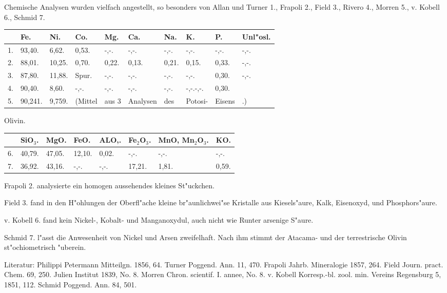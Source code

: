 \documentclass[a4paper, 11pt, oneside]{article}
\begin{document}
Chemische Analysen wurden vielfach angestellt, so besonders von Allan und Turner 1., Frapoli 2., Field 3., Rivero 4., Morren 5., v. Kobell 6., Schmid 7.
\begin{table}[H]
    \centering
    \footnotesize
    \begin{tabular}{l l l l l l l l l l}
         & Fe. & Ni. & Co. & Mg. & Ca. & Na. & K. & P. & Unl"osl. \\ \hline
        1. & 93,40. & 6,62. & 0,53. & -,-. & -,-. & -,-. & -,-. & -,-. & -,-. \\
        2. & 88,01. & 10,25. & 0,70. & 0,22. & 0,13. & 0,21. & 0,15. & 0,33. & -,-. \\
        3. & 87,80. & 11,88. & Spur. & -,-. & -,-. & -,-. & -,-. & 0,30. & -,-. \\
        4. & 90,40. & 8,60. & -,-. & -,-. & -,-. & -,-. & -,-.-,-. & 0,30. &  \\
        5. & 90,241. & 9,759. & (Mittel & aus 3 & Analysen & des & Potosi- & Eisens & .) \\
    \end{tabular}
\end{table}

Olivin.
\begin{table}[H]
    \centering
    \begin{tabular}{l l l l l l l l}
         & SiO$_{3}$. & MgO. & FeO. & ALO,. & Fe$_{2}$O$_{3}$. & MnO, Mn$_{2}$O$_{3}$. & KO. \\ \hline
        6. & 40,79. & 47,05. & 12,10. & 0,02. & -,-. & -,-. & -,-. \\
        7. & 36,92. & 43,16. & -,-. & -,-. & 17,21. & 1,81. & 0,59. \\
    \end{tabular}
\end{table}

Frapoli 2. analysierte ein homogen aussehendes kleines St"uckchen.

Field 3. fand in den H"ohlungen der Oberfl"ache kleine br"aunlichwei"se Kristalle aus Kiesels"aure, Kalk, Eisenoxyd, und Phosphors"aure.

v. Kobell 6. fand kein Nickel-, Kobalt- und Manganoxydul, auch nicht wie Runter arsenige S"aure.

Schmid 7. l"asst die Anwesenheit von Nickel und Arsen zweifelhaft. Nach ihm stimmt der Atacama- und der terrestrische Olivin st"ochiometrisch "uberein.

\footnotesize
Literatur: Philippi Petermann Mitteilgn. 1856, 64. Turner Poggend. Ann. 11, 470. Frapoli Jahrb. Mineralogie 1857, 264. Field Journ. pract. Chem. 69, 250. Julien Institut 1839, No. 8. Morren Chron. scientif. I. annee, No. 8. v. Kobell Korresp.-bl. zool. min. Vereins Regensburg 5, 1851, 112. Schmid Poggend. Ann. 84, 501.
\end{document}
